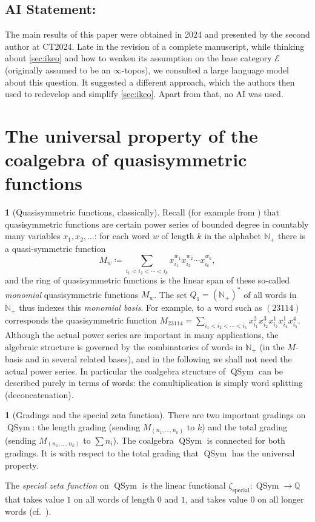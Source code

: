 \documentclass{amsart}
\newcommand{\basecat}{\mathcal{E}}
\newcommand{\Q}{\mathbb{Q}}
\newcommand{\QSym}{\operatorname{QSym}}
\newcommand{\N}{\mathbb{N}}
\theoremstyle{definition}
\theoremstyle{noname}
\newtheorem{blanko}[theorem]{}
\begin{document}
\subsection*{AI Statement:} 
The main results of this paper were obtained in 2024 and presented by the second author at CT2024. 
Late in the revision of a complete manuscript, while thinking about \cref{sec:ikeo} and how to weaken its assumption on the base category $\basecat$ (originally assumed to be an $\infty$-topos), we consulted a large language model about this question. 
It suggested a different approach, which the authors then used to redevelop and simplify \cref{sec:ikeo}. 
Apart from that, no AI was used.

\section{The universal property of the coalgebra of quasisymmetric functions}\label{sec universal coalgebra qsym}


\begin{blanko}[Quasisymmetric functions, classically]
  Recall (for example from \cite{Stanley:volII}) that quasisymmetric functions
  are certain power series of bounded degree in countably many variables
  $x_1,x_2,\ldots$: for each word $w$ of length $k$ in the alphabet $\N_+$ there
  is a quasi-symmetric function
  $$
  M_w \coloneq \sum_{i_1 < i_2 <\cdots < i_k} x_{i_1}^{w_1} x_{i_2}^{w_2} \cdots
  x_{i_k}^{w_k} ,
  $$
  and the ring of quasisymmetric functions is the linear span of these
  so-called {\em monomial} quasisymmetric functions $M_w$. The set $Q_1 =
  (\N_+)^*$ of all words in $\N_+$ thus indexes this {\em monomial basis}. For
  example, to a word such as $(23114)$ corresponds the quasisymmetric function
  $M_{23114} = \sum_{i_1 < i_2 <\cdots < i_5} x_{i_1}^2 x_{i_2}^3 x_{i_3}^1
  x_{i_4}^1 x_{i_5}^4$. Although the actual power series are important in many
  applications, the algebraic structure is governed by the combinatorics of
  words in $\N_+$ (in the $M$-basis and in several related bases), and in the
  following we shall not need the actual power series. In particular the
  coalgebra structure of $\QSym$ can be described purely in terms of words: the
  comultiplication is simply word splitting (deconcatenation).
\end{blanko}

\begin{blanko}[Gradings and the special zeta function]
  \label{Q-gradings-and-special-zeta}
  There are two important gradings on $\QSym$: the length grading (sending
  $M_{(n_1,\ldots,n_k)}$ to $k$) and the total grading (sending
  $M_{(n_1,\ldots,n_k)}$ to $\sum n_i$). The coalgebra $\QSym$ is connected for
  both gradings. It is with respect to the total grading that $\QSym$ has the
  universal property.
  
  The {\em special zeta function} on $\QSym$ is the linear functional 
  $\zeta_{\operatorname{special}} \colon \QSym \to \Q$
  that takes value $1$ on all words of length $0$
  and $1$, and takes value $0$ on all longer words
  (cf.~\cite{Aguiar-Bergeron-Sottile}).
\end{blanko}
\end{document}
